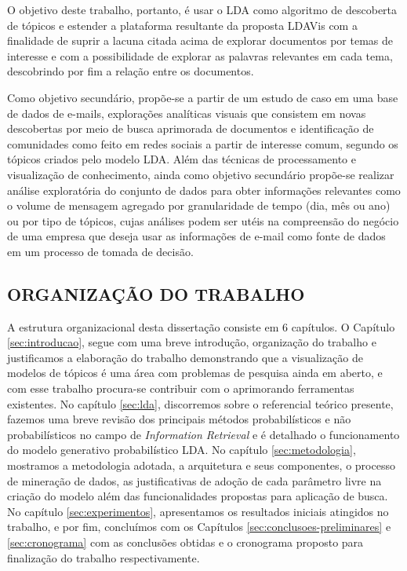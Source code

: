 \documentclass[12pt,a4paper]{article}
\begin{document}
O objetivo deste trabalho, portanto, é usar o LDA como algoritmo de descoberta de tópicos e estender a plataforma resultante da proposta LDAVis com a finalidade de suprir a lacuna citada acima de explorar documentos por temas de interesse e com a possibilidade de explorar as palavras relevantes em cada tema, descobrindo por fim a relação entre os documentos.

Como objetivo secundário, propõe-se a partir de um estudo de caso em uma base de dados de e-mails, explorações analíticas visuais que consistem em novas descobertas por meio de busca aprimorada de documentos e identificação de  comunidades como feito em redes  sociais a partir de interesse comum, segundo os tópicos criados pelo modelo LDA. Além das técnicas de processamento e visualização de conhecimento, ainda como objetivo secundário propõe-se realizar análise exploratória do conjunto de dados para obter informações relevantes como o volume de mensagem agregado por granularidade de tempo (dia, mês ou ano) ou por tipo de tópicos, cujas análises podem ser utéis na compreensão do negócio de uma empresa que deseja usar as informações de e-mail como fonte de dados em um processo de tomada de decisão.


\subsection{ORGANIZAÇÃO DO TRABALHO} \label{sec:organizacao}

 A estrutura organizacional desta dissertação consiste em 6 capítulos. O Capítulo \ref{sec:introducao}, segue com uma breve introdução, organização do trabalho e justificamos a elaboração do trabalho
  demonstrando que a visualização de modelos de tópicos é uma área com problemas de pesquisa ainda em aberto, e com esse trabalho procura-se contribuir com o aprimorando ferramentas existentes. 
  No capítulo \ref{sec:lda}, discorremos sobre o referencial teórico presente, fazemos uma breve revisão dos principais métodos probabilísticos e não probabilísticos no campo de \textit{Information Retrieval}
  e é detalhado o funcionamento do modelo generativo probabilístico LDA. No capítulo \ref{sec:metodologia}, mostramos a metodologia adotada, 
  a arquitetura e seus componentes, o processo de mineração de dados, as justificativas de adoção de cada parâmetro livre na criação do modelo além das funcionalidades propostas para
  aplicação de busca. No capítulo \ref{sec:experimentos}, apresentamos os resultados iniciais atingidos no trabalho, e por fim, concluímos com os Capítulos \ref{sec:conclusoes-preliminares} e \ref{sec:cronograma}
  com as conclusões obtidas e o cronograma proposto para finalização do trabalho respectivamente.
\end{document}
